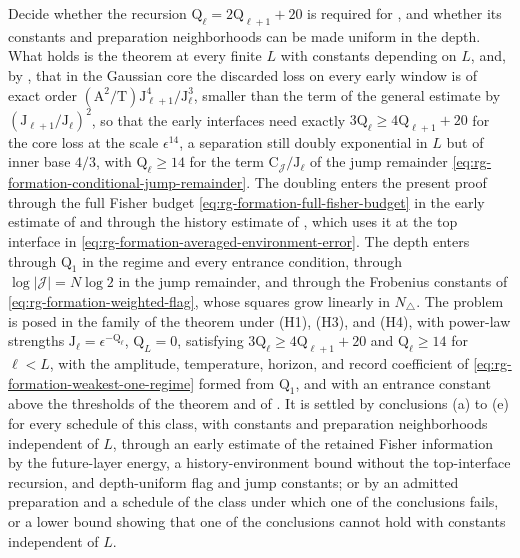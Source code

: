 Decide whether the recursion \(\mathrm Q_\ell=2\mathrm Q_{\ell+1}+20\) is
required for , and whether its
constants and preparation neighborhoods can be made uniform in the depth.
What holds is the theorem at every finite \(L\) with constants depending on
\(L\), and, by , that in the Gaussian
core the discarded loss on every early window is of exact order
\((\mathrm A^2/\mathrm T)\mathrm J_{\ell+1}^4/\mathrm J_\ell^3\), smaller than
the term of the general estimate by \((\mathrm J_{\ell+1}/\mathrm J_\ell)^2\),
so that the early interfaces need exactly
\(3\mathrm Q_\ell\ge4\mathrm Q_{\ell+1}+20\) for the core loss at the scale
\(\epsilon^{14}\), a separation still doubly exponential in \(L\) but of inner
base \(4/3\), with \(\mathrm Q_\ell\ge14\) for the term
\(\mathrm C_{\mathcal J}/\mathrm J_\ell\) of the jump remainder
\cref{eq:rg-formation-conditional-jump-remainder}. The doubling enters the
present proof through the full Fisher budget
\cref{eq:rg-formation-full-fisher-budget} in the early estimate of
 and through the history estimate of
, which uses it at the top interface in
\cref{eq:rg-formation-averaged-environment-error}. The depth enters through
\(\mathrm Q_1\) in the regime and every entrance condition, through
\(\log|\mathcal J|=N\log2\) in the jump remainder, and through the Frobenius
constants of \cref{eq:rg-formation-weighted-flag}, whose squares grow linearly
in \(N_\triangle\). The problem is posed in the family of the theorem under
(H1), (H3), and (H4), with power-law strengths
\(\mathrm J_\ell=\epsilon^{-\mathrm Q_\ell}\), \(\mathrm Q_L=0\), satisfying
\(3\mathrm Q_\ell\ge4\mathrm Q_{\ell+1}+20\) and \(\mathrm Q_\ell\ge14\) for
\(\ell<L\), with the amplitude, temperature, horizon, and record coefficient
of \cref{eq:rg-formation-weakest-one-regime} formed from \(\mathrm Q_1\), and
with an entrance constant above the thresholds of the theorem and of
. It is settled by conclusions (a) to
(e) for every schedule of this class, with constants and preparation
neighborhoods independent of \(L\), through an early estimate of the retained
Fisher information by the future-layer energy, a history-environment bound
without the top-interface recursion, and depth-uniform flag and jump
constants; or by an admitted preparation and a schedule of the class under
which one of the conclusions fails, or a lower bound showing that one of the
conclusions cannot hold with constants independent of \(L\).


